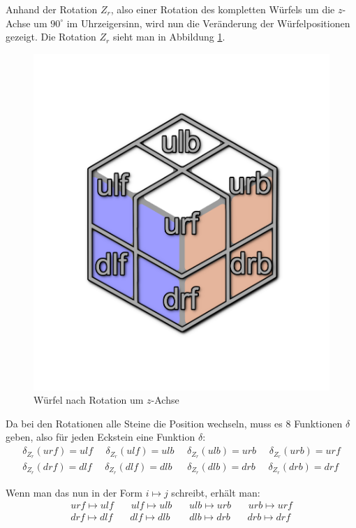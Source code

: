 \documentclass[12pt,a4paper, usenames, dvipsnames]{article}
\theoremstyle{mystyle}
\theoremstyle{definition}
\begin{document}
Anhand der Rotation $Z_r$, also einer Rotation des kompletten Würfels um die $z$-Achse um $90^\circ$ im Uhrzeigersinn, wird nun die Veränderung der Würfelpositionen gezeigt. Die Rotation $Z_r$ sieht man in Abbildung \ref{16}.
\begin{figure}[H]
\centering
\includegraphics[scale=0.13]{auf_ulf.png}
\caption{Würfel nach Rotation um $z$-Achse}
\label{16}
\end{figure}
Da bei den Rotationen alle Steine die Position wechseln, muss es 8 Funktionen $\delta$ geben, also für jeden Eckstein eine Funktion $\delta$:
\begin{align*}
\delta_{Z_r}(urf) = ulf \ \ \ \ \ \ \delta_{Z_r}(ulf) = ulb \ \ \ \ \ \ \delta_{Z_r}(ulb) = urb \ \ \ \ \ \ \delta_{Z_r}(urb) = urf \\
\delta_{Z_r}(drf) = dlf \ \ \ \ \ \ \delta_{Z_r}(dlf) = dlb \ \ \ \ \ \ \ \delta_{Z_r}(dlb) = drb \ \ \ \ \ \ \delta_{Z_r}(drb) = drf
\end{align*}

Wenn man das nun in der Form $i \mapsto j$ schreibt, erhält man: 
\begin{align*}
urf \mapsto ulf \ \ \ \ \ \ \ \ ulf \mapsto ulb \ \ \ \ \ \ \ \ ulb \mapsto urb \ \ \ \ \ \ \ \ urb \mapsto urf \\
drf \mapsto dlf \ \ \ \ \ \ \ \ dlf \mapsto dlb \ \ \ \ \ \ \ \ \ dlb \mapsto drb \ \ \ \ \ \ \ \ drb \mapsto drf
\end{align*}
\end{document}
